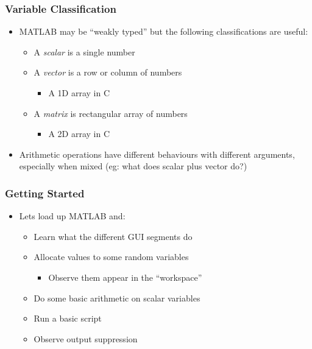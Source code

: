 \documentclass[14pt]{beamer}
\begin{document}
\begin{frame}
\frametitle{Variable Classification}
\begin{itemize}
\item MATLAB may be ``weakly typed'' but the following classifications are useful:
	\begin{itemize}
		\item A \textit{scalar} is a single number
		\item A \textit{vector} is a row or column of numbers 
		\begin{itemize}
			\item A 1D array in C
		\end{itemize}
		\item A \textit{matrix} is rectangular array of numbers
		\begin{itemize}
			\item A 2D array in C
		\end{itemize} 
	\end{itemize}
\pause
\item Arithmetic operations have different behaviours with different arguments, especially when mixed (eg: what does scalar plus vector do?)
\end{itemize}
\end{frame}

\begin{frame}
\frametitle{Getting Started}
\begin{itemize}
\item Lets load up MATLAB and:
	\begin{itemize}
		\item Learn what the different GUI segments do
		\item Allocate values to some random variables
			\begin{itemize}
				\item Observe them appear in the ``workspace''
			\end{itemize}
		\item Do some basic arithmetic on scalar variables
		\item Run a basic script
		\item Observe output suppression
	\end{itemize}
\end{itemize}
\end{frame}
\end{document}
